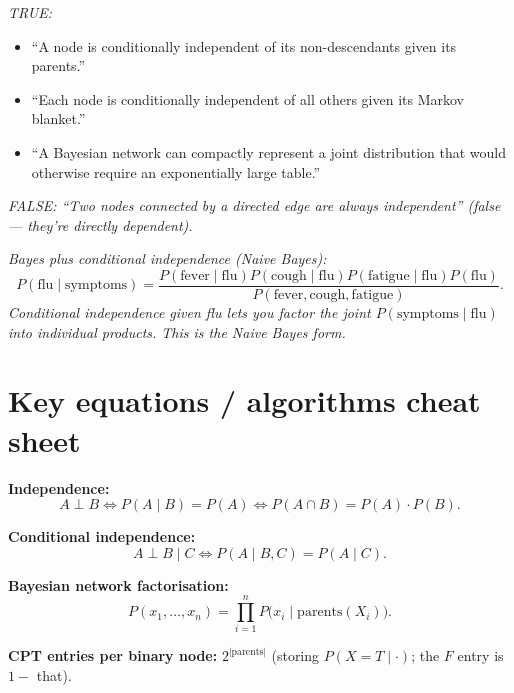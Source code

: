 \documentclass[11pt, a4paper]{article}
\begin{document}
\begin{exambox}
\textit{TRUE:}
\begin{itemize}[leftmargin=*, itemsep=0pt, topsep=0pt]
  \item ``A node is conditionally independent of its non-descendants given its parents.''
  \item ``Each node is conditionally independent of all others given its Markov blanket.''
  \item ``A Bayesian network can compactly represent a joint distribution that would otherwise require an exponentially large table.''
\end{itemize}
\textit{FALSE: ``Two nodes connected by a directed edge are always independent'' (false — they're directly dependent).}
\end{exambox}

\begin{exambox}
\textit{Bayes plus conditional independence (Naive Bayes):}
\[
P(\mathrm{flu} \mid \mathrm{symptoms}) = \frac{P(\mathrm{fever} \mid \mathrm{flu}) P(\mathrm{cough} \mid \mathrm{flu}) P(\mathrm{fatigue} \mid \mathrm{flu}) P(\mathrm{flu})}{P(\mathrm{fever}, \mathrm{cough}, \mathrm{fatigue})}.
\]
\textit{Conditional independence given flu lets you factor the joint $P(\text{symptoms} \mid \text{flu})$ into individual products. This is the Naive Bayes form.}
\end{exambox}

\section*{Key equations / algorithms cheat sheet}

\textbf{Independence:}
\[
A \perp B \iff P(A \mid B) = P(A) \iff P(A \cap B) = P(A) \cdot P(B).
\]

\textbf{Conditional independence:}
\[
A \perp B \mid C \iff P(A \mid B, C) = P(A \mid C).
\]

\textbf{Bayesian network factorisation:}
\[
P(x_1, \dots, x_n) = \prod_{i=1}^n P\bigl(x_i \mid \mathrm{parents}(X_i)\bigr).
\]

\textbf{CPT entries per binary node:} $2^{|\mathrm{parents}|}$ (storing $P(X = T \mid \cdot)$; the $F$ entry is $1 -$ that).
\end{document}
